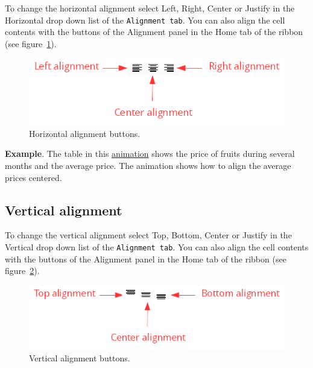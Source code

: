 To change the horizontal alignment select Left, Right, Center or Justify in the Horizontal drop down list of the
\texttt{Alignment tab}. You can also align the cell contents with the buttons of the Alignment panel in the Home tab of
the ribbon (see figure~\ref{img-button_horizontal_alignment}).

\begin{figure}[htbp]
\begin{center}
\includegraphics[scale=0.7]{../img/button_horizontal_alignment.png}
\end{center}
\caption{Horizontal alignment buttons.}
\label{img-button_horizontal_alignment}
\end{figure}

\textbf{Example}. The table in this \href{http://aprendeconalf.es/office/excel/manual/img/example_alignment.gif}{animation} shows the price of fruits during several months and the average price. The animation shows how to align the average prices centered.

\subsection{Vertical alignment}\hypertarget{vertical-alignment}{}\label{vertical-alignment}

To change the vertical alignment select Top, Bottom, Center or Justify in the Vertical drop down list of the
\texttt{Alignment tab}. You can also align the cell contents with the buttons of the Alignment panel in the Home tab of
the ribbon (see figure~\ref{img-button_vertical_alignment}).

\begin{figure}[htbp]
\begin{center}
\includegraphics[scale=0.7]{../img/button_vertical_alignment.png}
\end{center}
\caption{Vertical alignment buttons.}
\label{img-button_vertical_alignment}
\end{figure}

